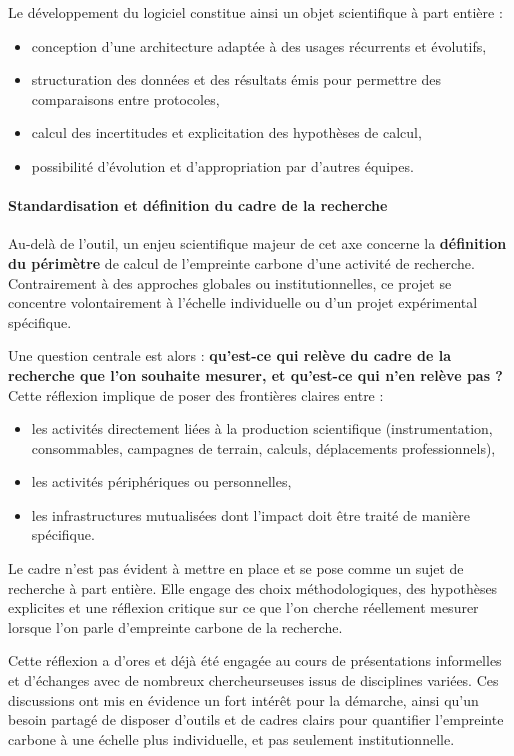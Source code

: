 \documentclass[11pt,a4paper]{article}
\begin{document}
Le développement du logiciel constitue ainsi un objet scientifique à part entière :
\begin{itemize}
    \item conception d’une architecture adaptée à des usages récurrents et évolutifs,
    \item structuration des données et des résultats émis pour permettre des comparaisons entre protocoles,
    \item calcul des incertitudes et explicitation des hypothèses de calcul,
    \item possibilité d’évolution et d’appropriation par d’autres équipes.
\end{itemize}

\paragraph{Standardisation et définition du cadre de la recherche}

Au-delà de l’outil, un enjeu scientifique majeur de cet axe concerne la \textbf{définition du périmètre} de calcul de l’empreinte carbone d'une activité de recherche.
Contrairement à des approches globales ou institutionnelles, ce projet se concentre volontairement à l’échelle individuelle ou d'un projet expérimental spécifique.

Une question centrale est alors : \textbf{qu’est-ce qui relève du cadre de la recherche que l’on souhaite mesurer, et qu’est-ce qui n’en relève pas ?}
Cette réflexion implique de poser des frontières claires entre :
\begin{itemize}
    \item les activités directement liées à la production scientifique (instrumentation, consommables, campagnes de terrain, calculs, déplacements professionnels),
    \item les activités périphériques ou personnelles,
    \item les infrastructures mutualisées dont l’impact doit être traité de manière spécifique.
\end{itemize}

Le cadre n’est pas évident à mettre en place et se pose comme un sujet de recherche à part entière. Elle engage des choix méthodologiques,
des hypothèses explicites et une réflexion critique sur ce que l’on cherche réellement mesurer lorsque l’on parle d’empreinte carbone de la recherche.

Cette réflexion a d’ores et déjà été engagée au cours de présentations informelles et d’échanges avec de nombreux chercheurs\textperiodcentered euses issus de disciplines variées.
Ces discussions ont mis en évidence un fort intérêt pour la démarche, ainsi qu’un besoin partagé de disposer d’outils et de cadres clairs pour quantifier l'empreinte carbone à une échelle plus individuelle, et pas seulement institutionnelle.
\end{document}

